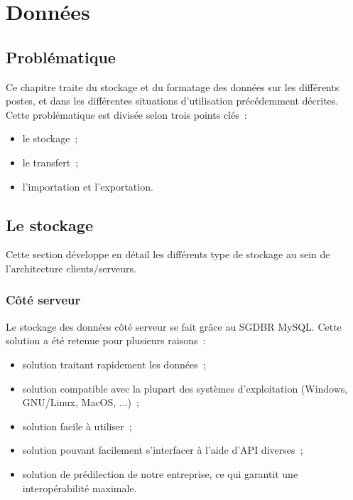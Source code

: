 \section{Données}\label{DonneesTechnique}

\newcommand{\Qt}{\href{http://qt-project.org/}{Qt}\xspace}

% 

\subsection{Problématique}
Ce chapitre traite du stockage et du formatage des données sur les différents postes, et dans les différentes situations d'utilisation précédemment décrites. \\
Cette problématique est divisée selon trois points clés~:
\begin{itemize}
	\item le stockage~;
	\item le transfert~;
	\item l'importation et l'exportation.
\end{itemize}

\subsection{Le stockage}
Cette section développe en détail les différents type de stockage au sein de l'architecture clients/serveurs.

\subsubsection{Côté serveur}
Le stockage des données côté serveur se fait grâce au SGDBR MySQL. Cette solution a été retenue pour plusieurs raisons~:
\begin{itemize}
	\item solution traitant rapidement les données~;
	\item solution compatible avec la plupart des systèmes d'exploitation (Windows, GNU/Linux, MacOS, ...)~;
	\item solution facile à utiliser~;
	\item solution pouvant facilement s'interfacer à l'aide d'API diverses~;
	\item solution de prédilection de notre entreprise, ce qui garantit une interopérabilité maximale.
\end{itemize}

